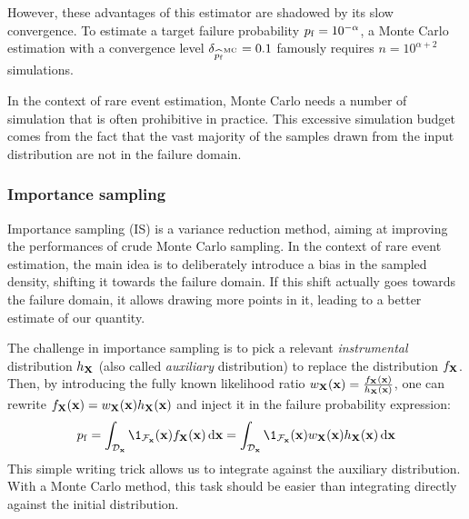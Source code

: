 However, these advantages of this estimator are shadowed by its slow convergence. 
To estimate a target failure probability $p_\mathrm{f}=10^{-\alpha}$, 
a Monte Carlo estimation with a convergence level $\delta_{\widehat{p_\mathrm{f}}^{\textrm{MC}}} = 0.1$ famously requires $n=10^{\alpha + 2}$ simulations. 

In the context of rare event estimation, Monte Carlo needs a number of simulation that is often prohibitive in practice. 
This excessive simulation budget comes from the fact that the vast majority of the samples drawn from the input distribution are not in the failure domain.


\subsubsection{Importance sampling}

Importance sampling (IS) is a variance reduction method, aiming at improving the performances of crude Monte Carlo sampling. 
In the context of rare event estimation, the main idea is to deliberately introduce a bias in the sampled density, shifting it towards the failure domain. 
If this shift actually goes towards the failure domain, it allows drawing more points in it, leading to a better estimate of our quantity.

The challenge in importance sampling is to pick a relevant \textit{instrumental} distribution $h_{\bf X}$ (also called \textit{auxiliary} distribution) to replace the distribution $f_{\bf X}$. 
Then, by introducing the fully known likelihood ratio $w_{\bf X}({\bf x}) = \frac{f_{\bf X}({\bf x})}{h_{\bf X}({\bf x})}$, one can rewrite $f_{\bf X}({\bf x}) = w_{\bf X}({\bf x}) h_{\bf X}({\bf x})$ and inject it in the failure probability expression: 
\begin{equation}
    \pf = \int_{\iD_\bx} \1_{\iF_\bx}(\bx) f_\bX(\bx) \, \dd\bx
        = \int_{\iD_\bx} \1_{\iF_\bx}(\bx) w_\bX(\bx) h_\bX(\bx) \, \dd\bx
\end{equation}
This simple writing trick allows us to integrate against the auxiliary distribution. 
With a Monte Carlo method, this task should be easier than integrating directly against the initial distribution.

